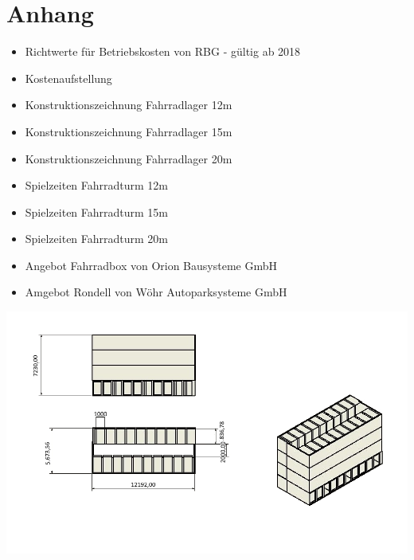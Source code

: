 \section{Anhang}

\begin{itemize}
  \item Richtwerte für Betriebskosten von RBG - gültig ab 2018
  \item Kostenaufstellung
  \item Konstruktionszeichnung Fahrradlager 12m
  \item Konstruktionszeichnung Fahrradlager 15m
  \item Konstruktionszeichnung Fahrradlager 20m
  \item Spielzeiten Fahrradturm 12m
  \item Spielzeiten Fahrradturm 15m
  \item Spielzeiten Fahrradturm 20m
  \item Angebot Fahrradbox von Orion Bausysteme GmbH
  \item Amgebot Rondell von Wöhr Autoparksysteme GmbH
\end{itemize}






\includegraphics[angle=90,height=\paperwidth]{anhang/Fahrradlager_v1.jpg}












